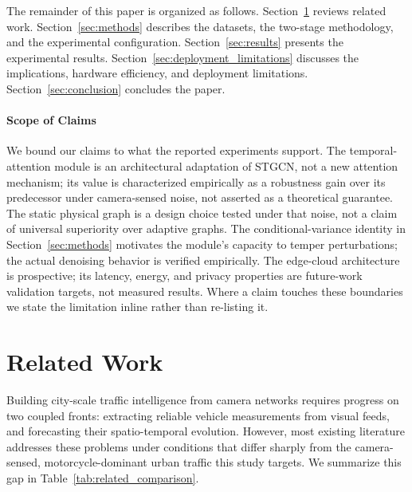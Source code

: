 \documentclass[journal,twocolumn]{IEEEtran}
\begin{document}
The remainder of this paper is organized as follows. Section~\ref{sec:related} reviews related work. Section~\ref{sec:methods} describes the datasets, the two-stage methodology, and the experimental configuration. Section~\ref{sec:results} presents the experimental results. Section~\ref{sec:deployment_limitations} discusses the implications, hardware efficiency, and deployment limitations. Section~\ref{sec:conclusion} concludes the paper.

\paragraph{Scope of Claims}
We bound our claims to what the reported experiments support. The temporal-attention module is an architectural adaptation of STGCN, not a new attention mechanism; its value is characterized empirically as a robustness gain over its predecessor under camera-sensed noise, not asserted as a theoretical guarantee. The static physical graph is a design choice tested under that noise, not a claim of universal superiority over adaptive graphs. The conditional-variance identity in Section~\ref{sec:methods} motivates the module's capacity to temper perturbations; the actual denoising behavior is verified empirically. The edge-cloud architecture is prospective; its latency, energy, and privacy properties are future-work validation targets, not measured results. Where a claim touches these boundaries we state the limitation inline rather than re-listing it.

\section{Related Work}
\label{sec:related}

Building city-scale traffic intelligence from camera networks requires progress on two coupled fronts: extracting reliable vehicle measurements from visual feeds, and forecasting their spatio-temporal evolution. However, most existing literature addresses these problems under conditions that differ sharply from the camera-sensed, motorcycle-dominant urban traffic this study targets. We summarize this gap in Table~\ref{tab:related_comparison}.
\end{document}
